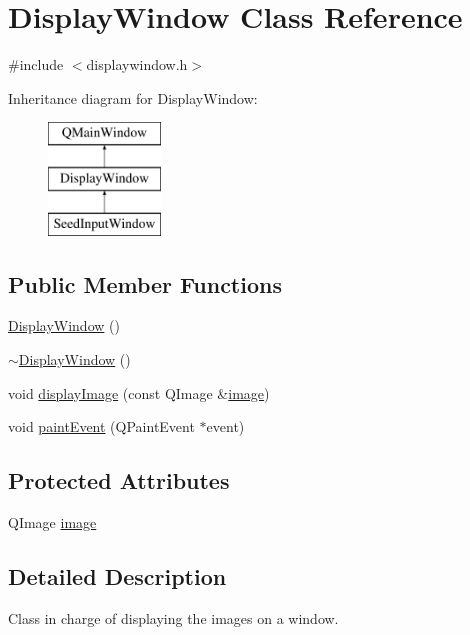 \hypertarget{classDisplayWindow}{\section{Display\-Window Class Reference}
\label{classDisplayWindow}
}


{\ttfamily \#include $<$displaywindow.\-h$>$}

Inheritance diagram for Display\-Window\-:\begin{figure}[H]
\begin{center}
\leavevmode
\includegraphics[height=3.000000cm]{classDisplayWindow}
\end{center}
\end{figure}
\subsection*{Public Member Functions}
\begin{DoxyCompactItemize}
\item 
\hyperlink{classDisplayWindow_abdc9ed2ae00b02f263498ad531e42bfa}{Display\-Window} ()
\item 
\hyperlink{classDisplayWindow_ae44d40aa2b4adb94332da5808fb5332c}{$\sim$\-Display\-Window} ()
\item 
void \hyperlink{classDisplayWindow_a8d29e0e63579cc008baf229b198ca144}{display\-Image} (const Q\-Image \&\hyperlink{classDisplayWindow_a312f36e9747e7f82d7b17be01429f69f}{image})
\item 
void \hyperlink{classDisplayWindow_aa01dee8e55e43adbab359d6de0ee9d4b}{paint\-Event} (Q\-Paint\-Event $\ast$event)
\end{DoxyCompactItemize}
\subsection*{Protected Attributes}
\begin{DoxyCompactItemize}
\item 
Q\-Image \hyperlink{classDisplayWindow_a312f36e9747e7f82d7b17be01429f69f}{image}
\end{DoxyCompactItemize}


\subsection{Detailed Description}
Class in charge of displaying the images on a window.

